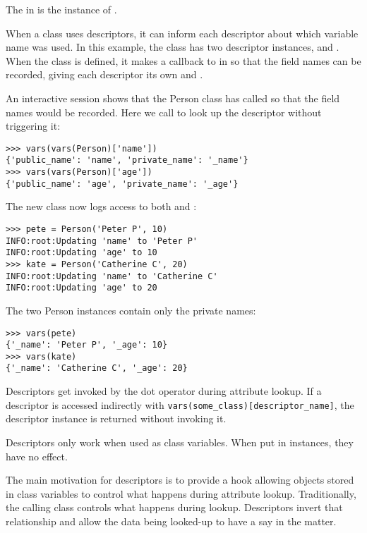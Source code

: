 The  in  is the instance of .


When a class uses descriptors, it can inform each descriptor about which variable name was used.
In this example, the  class has two descriptor instances,  and .
When the  class is defined, it makes a callback to  in  so that the field names can be recorded, giving each descriptor its own  and .



An interactive session shows that the Person class has called  so that the field names would be recorded.
Here we call  to look up the descriptor without triggering it:
\begin{lstlisting}
>>> vars(vars(Person)['name'])
{'public_name': 'name', 'private_name': '_name'}
>>> vars(vars(Person)['age'])
{'public_name': 'age', 'private_name': '_age'}
\end{lstlisting}

The new class now logs access to both  and :
\begin{lstlisting}
>>> pete = Person('Peter P', 10)
INFO:root:Updating 'name' to 'Peter P'
INFO:root:Updating 'age' to 10
>>> kate = Person('Catherine C', 20)
INFO:root:Updating 'name' to 'Catherine C'
INFO:root:Updating 'age' to 20
\end{lstlisting}


The two Person instances contain only the private names:


\begin{lstlisting}
>>> vars(pete)
{'_name': 'Peter P', '_age': 10}
>>> vars(kate)
{'_name': 'Catherine C', '_age': 20}
\end{lstlisting}




Descriptors get invoked by the dot operator during attribute lookup.
If a descriptor is accessed indirectly with \lstinline|vars(some_class)[descriptor_name]|, the descriptor instance is returned without invoking it.

Descriptors only work when used as class variables.
When put in instances, they have no effect.

The main motivation for descriptors is to provide a hook allowing objects stored in class variables to control what happens during attribute lookup.
Traditionally, the calling class controls what happens during lookup. Descriptors invert that relationship and allow the data being looked-up to have a say in the matter.

